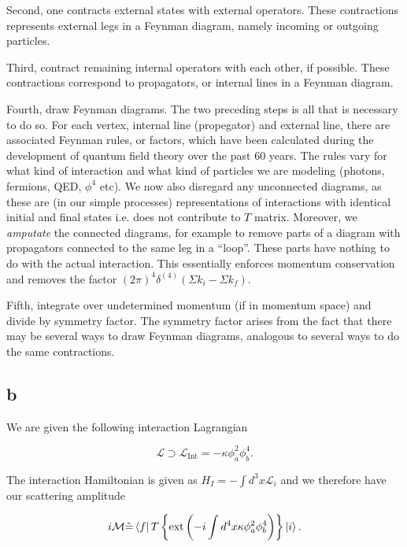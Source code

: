 \documentclass[11pt, a4paper]{amsart}
\begin{document}
Second, one contracts external states with external operators. These contractions represents external legs in a Feynman diagram, namely incoming or outgoing particles. 

Third, contract remaining internal operators with each other, if possible.  These contractions correspond to propagators, or internal lines in a Feynman diagram.

Fourth, draw Feynman diagrams. The two preceding steps is all that is necessary to do so. For each vertex, internal line (propegator) and external line, there are associated Feynman rules, or factors, which have been calculated during the development of quantum field theory over the past 60 years. The rules vary for what kind of interaction and what kind of particles we are modeling (photons, fermions, QED, $\phi^4$ etc). We now also disregard any unconnected diagrams, as these are (in our simple processes) representations of interactions with identical initial and final states i.e. does not contribute to $T$ matrix. Moreover, we \emph{amputate} the connected diagrams, for example to remove parts of a diagram with propagators connected to the same leg in a ``loop''. These parts have nothing to do with the actual interaction. This essentially enforces momentum conservation and removes the factor $(2\pi)^4 \delta^{(4)}(\Sigma k_i -\Sigma  k_f)$.

Fifth, integrate over undetermined momentum (if in momentum space) and divide by symmetry factor. The symmetry factor arises from the fact that there may be several ways to draw Feynman diagrams, analogous to several ways to do the same contractions.

\subsection*{b}

We are given the following interaction Lagrangian

\begin{equation}
\mathcal{L} \supset \mathcal{L}_{\text{Int}} = - \kappa \phi_a^2\phi_b^4.
\end{equation}

The interaction Hamiltonian is given as $H_I = -\int d^3x \mathcal{L}_i$ and we therefore have our scattering amplitude

\begin{equation}
i\mathcal{M} \hat{=} \bra{f}T \left\{\text{ext} \left(- i\int d^4x \kappa \phi_a^2\phi_b^4\right) \right\} \ket{i}.
\end{equation}
\end{document}
